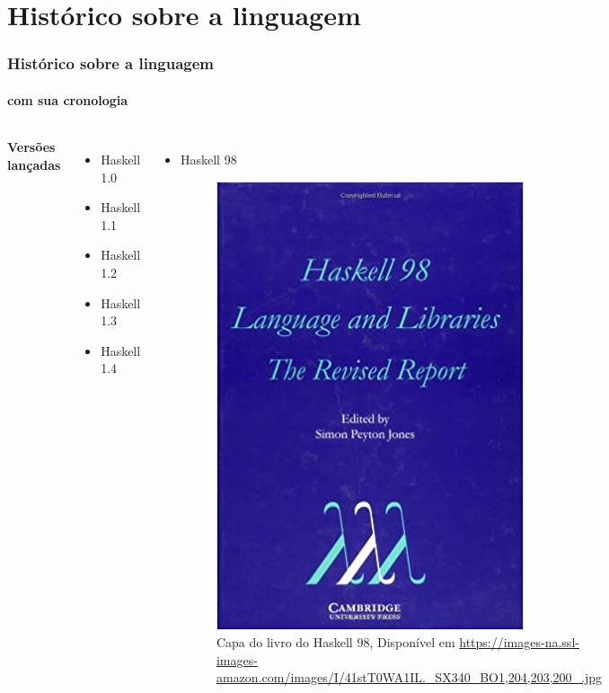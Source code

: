 \documentclass[aspectratio=169]{beamer}
\begin{document}
    \section{Histórico sobre a linguagem}
    \begin{frame}

      \frametitle{Histórico sobre a linguagem}
      \framesubtitle{com sua cronologia}

      \begin{columns}
        \textbf{Versões lançadas} 

        \begin{itemize}
          \item Haskell 1.0 
          \item Haskell 1.1
          \item Haskell 1.2
          \item Haskell 1.3
          \item Haskell 1.4 \pause
           
        \end{itemize}

        
        \begin{itemize}
          \item Haskell 98
          
          \begin{figure}  
            \includegraphics[scale=0.2]{book_haskell98.jpg}
            \caption{\centering Capa do livro do Haskell 98, Disponível em \url{https://images-na.ssl-images-amazon.com/images/I/41stT0WA1IL._SX340_BO1,204,203,200_.jpg}}
          \end{figure} 

        \end{itemize}

      \end{columns}

    \end{frame}
\end{document}
